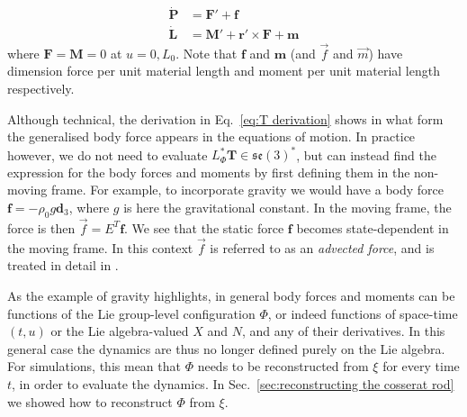 \begin{subequations} \label{eq:dynamics in terms of V and L fixed frame with body forces}
\begin{align}
\dot{\mathbf{P}} & = \mathbf{F}' + \mathbf{f} \\
\dot{\mathbf{L}} & = \mathbf{M}' + \mathbf{r}' \times \mathbf{F}  + \mathbf{m}
\end{align}
\end{subequations}
where $\mathbf{F} = \mathbf{M} = 0$ at $u = 0, L_0$. Note that $\mathbf{f}$ and $\mathbf{m}$ (and $\vec{f}$ and $\vec{m}$) have dimension force per unit material length and moment per unit material length respectively.

Although technical, the derivation in Eq.~\ref{eq:T derivation} shows in what form the generalised body force appears in the equations of motion. In practice however, we do not need to evaluate $L^*_\Phi \mathbf{T} \in \mathfrak{se}(3)^*$, but can instead find the expression for the body forces and moments by first defining them in the non-moving frame. For example, to incorporate gravity we would have a body force $\mathbf{f} = - \rho_0 g \mathbf{d}_3$, where $g$ is here the gravitational constant. In the moving frame, the force is then $\vec{f} = E^T \mathbf{f}$. We see that the static force $\mathbf{f}$ becomes state-dependent in the moving frame. In this context $\vec{f}$ is referred to as an \textit{advected force}, and is treated in detail in \citep{holmEulerPoincareEquations1998, cendraMaxwellVlasovEquations1998, holmGeometricMechanicsPart}.

As the example of gravity highlights, in general body forces and moments can be functions of the Lie group-level configuration $\Phi$, or indeed functions of space-time $(t,u)$ or the Lie algebra-valued $X$ and $N$, and any of their derivatives. In this general case the dynamics are thus no longer defined purely on the Lie algebra. For simulations, this mean that $\Phi$ needs to be reconstructed from $\xi$ for every time $t$, in order to evaluate the dynamics. In Sec.~\ref{sec:reconstructing the cosserat rod} we showed how to reconstruct $\Phi$ from $\xi$.

